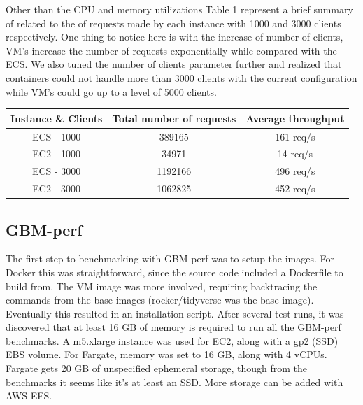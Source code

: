 \documentclass[11pt]{article}
\begin{document}
Other than the CPU and memory utilizations Table 1 represent a brief summary of related to the of requests made by each instance with 1000 and 3000 clients respectively. One thing to notice here is with the increase of number of clients, VM's increase the number of requests exponentially while compared with the ECS. We also tuned the number of clients parameter further and realized that containers could not handle more than 3000 clients with the current configuration while VM's could go up to a level of 5000 clients. 

\begin{center}
\captionsetup[table]{position=bottom}
 \begin{tabular}{||c c c ||} 
 \hline
 Instance \& Clients & Total number of requests & Average throughput  \\ [0.5ex] 
 \hline
 ECS - 1000 & 389165 & 161 req/s  \\ 
 \hline
 EC2 - 1000 & 34971 & 14 req/s \\ 
 \hline
 ECS - 3000 & 1192166 & 496 req/s  \\ 
 \hline
 EC2 - 3000 & 1062825 & 452 req/s \\ 
  \hline

\end{tabular}

\end{center}

\subsection{GBM-perf}

The first step to benchmarking with GBM-perf was to setup the images. For Docker this was straightforward, since the source code included a Dockerfile to build from. The VM image was more involved, requiring backtracing the commands from the base images (rocker/tidyverse was the base image). Eventually this resulted in an installation script. After several test runs, it was discovered that at least 16 GB of memory is required to run all the GBM-perf benchmarks. A m5.xlarge instance was used for EC2, along with a gp2 (SSD) EBS volume. For Fargate, memory was set to 16 GB, along with 4 vCPUs. Fargate gets 20 GB of unspecified ephemeral storage, though from the benchmarks it seems like it's at least an SSD. More storage can be added with AWS EFS.
\end{document}
